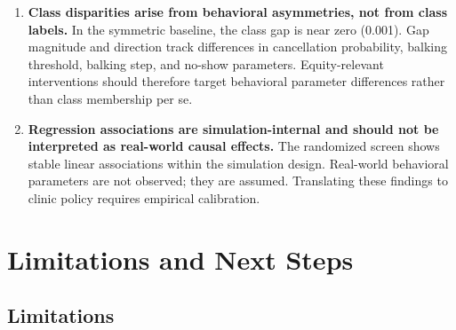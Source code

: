 \documentclass[11pt]{article}
\begin{document}
\begin{enumerate}
\item \textbf{Class disparities arise from behavioral asymmetries, not
from class labels.}
In the symmetric baseline, the class gap is near zero (0.001). Gap magnitude
and direction track differences in cancellation probability, balking
threshold, balking step, and no-show parameters. Equity-relevant
interventions should therefore target behavioral parameter differences
rather than class membership per se.

\item \textbf{Regression associations are simulation-internal and should
not be interpreted as real-world causal effects.}
The randomized screen shows stable linear associations within the
simulation design. Real-world behavioral parameters are not observed;
they are assumed. Translating these findings to clinic policy requires
empirical calibration.

\end{enumerate}

\section{Limitations and Next Steps}

\subsection{Limitations}
\end{document}
